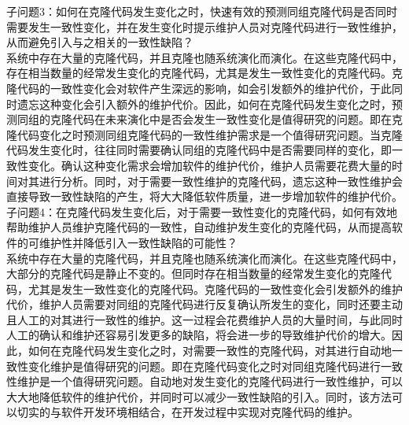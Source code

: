 子问题3：如何在克隆代码发生变化之时，快速有效的预测同组克隆代码是否同时需要发生一致性变化，并在发生变化时提示维护人员对克隆代码进行一致性维护，从而避免引入与之相关的一致性缺陷？\\

系统中存在大量的克隆代码，并且克隆也随系统演化而演化。在这些克隆代码中，存在相当数量的经常发生变化的克隆代码，尤其是发生一致性变化的克隆代码。克隆代码的一致性变化会对软件产生深远的影响，如会引发额外的维护代价，于此同时遗忘这种变化会引入额外的维护代价。因此，如何在克隆代码发生变化之时，预测同组的克隆代码在未来演化中是否会发生一致性变化是值得研究的问题。即在克隆代码变化之时预测同组克隆代码的一致性维护需求是一个值得研究问题。当克隆代码发生变化时，往往同时需要确认同组的克隆代码中是否需要同样的变化，即一致性变化。确认这种变化需求会增加软件的维护代价，维护人员需要花费大量的时间对其进行分析。同时，对于需要一致性维护的克隆代码，遗忘这种一致性维护会直接导致一致性缺陷的产生，将大大降低软件质量，进一步增加软件的维护代价。\\

子问题4：在克隆代码发生变化后，对于需要一致性变化的克隆代码，如何有效地帮助维护人员维护克隆代码的一致性，自动维护发生变化的克隆代码，从而提高软件的可维护性并降低引入一致性缺陷的可能性？\\

系统中存在大量的克隆代码，并且克隆也随系统演化而演化。在这些克隆代码中，大部分的克隆代码是静止不变的。但同时存在相当数量的经常发生变化的克隆代码，尤其是发生一致性变化的克隆代码。克隆代码的一致性变化会引发额外的维护代价，维护人员需要对同组的克隆代码进行反复确认所发生的变化，同时还要主动且人工的对其进行一致性的维护。这一过程会花费维护人员的大量时间，与此同时人工的确认和维护还容易引发更多的缺陷，将会进一步的导致维护代价的增大。因此，如何在克隆代码发生变化之时，对需要一致性的克隆代码，对其进行自动地一致性变化维护是值得研究的问题。即在克隆代码变化之时对同组克隆代码进行一致性维护是一个值得研究问题。自动地对发生变化的克隆代码进行一致性维护，可以大大地降低软件的维护代价，并同时可以减少一致性缺陷的引入。同时，该方法可以切实的与软件开发环境相结合，在开发过程中实现对克隆代码的维护。





